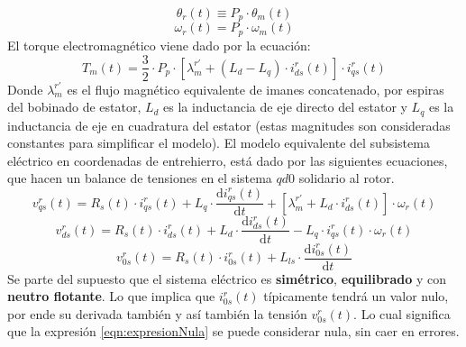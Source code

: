 \documentclass[10pt]{article}
\begin{document}
\begin{enumerate}
\begin{itemize}
\begin{equation}
		\end{equation}
		\begin{equation}
			\theta_{r} \left ( t \right ) \equiv P_{p} \cdot \theta_{m} \left ( t \right )
		\end{equation}
		\begin{equation}
			\omega_{r}\left ( t \right )=P_{p}\cdot \omega_{m}\left ( t \right )
		\end{equation}
		El torque electromagnético viene dado por la ecuación:
		\begin{equation}
			\label{sist:electromagnetico}
			T_{m}\left ( t \right )=\frac{3}{2} \cdot P_{p} \cdot \left [ \lambda_{m}^{r'}+\left ( L_{d}-L_{q} \right )\cdot i_{ds}^{r} \left ( t \right ) \right ] \cdot i_{qs}^{r}\left ( t \right )
		\end{equation}
		Donde $\lambda_{m}^{r'}$ es el flujo magnético equivalente de imanes concatenado, por espiras del bobinado de estator,
		$L_{d}$ es la inductancia de eje directo del estator y $L_{q}$ es la inductancia de eje en cuadratura del estator (estas magnitudes son consideradas constantes para simplificar el modelo).
		El modelo equivalente del subsistema eléctrico en coordenadas de entrehierro, está dado por las siguientes ecuaciones, que hacen un balance de tensiones en el sistema $qd0$ solidario al rotor.
		\begin{equation}
			\label{sist:electrico1}
			v_{qs}^{r}\left ( t \right )=R_{s}\left ( t \right )\cdot i_{qs}^{r}\left ( t \right )+L_{q}\cdot \frac{\mathrm{d} i_{qs}^{r}\left ( t \right )}{\mathrm{d} t}+\left [ \lambda_{m}^{r'}+L_{d}\cdot i_{ds}^{r}\left ( t \right ) \right ]\cdot \omega_{r}\left ( t \right )
		\end{equation}
		\begin{equation}
			\label{sist:electrico2}
			v_{ds}^{r}\left ( t \right )=R_{s}\left ( t \right )\cdot i_{ds}^{r}\left ( t \right )+L_{d}\cdot \frac{\mathrm{d} i_{ds}^{r}\left ( t \right )}{\mathrm{d} t}-L_{q}\cdot i_{qs}^{r}\left ( t \right )\cdot \omega_{r}\left ( t \right )
		\end{equation}
		\begin{equation}
			\label{eqn:expresionNula}
			v_{0s}^{r}\left ( t \right )=R_{s}\left ( t \right )\cdot i_{0s}^{r}\left ( t \right )+L_{ls}\cdot \frac{\mathrm{d} i_{0s}^{r}\left ( t \right )}{\mathrm{d} t}
		\end{equation}
		Se parte del supuesto que el sistema eléctrico es \textbf{simétrico}, \textbf{equilibrado} y con \textbf{neutro flotante}.
		Lo que implica que $i_{0s}^{r}(t)$ típicamente tendrá un valor nulo, por ende su derivada también y así también la tensión $v_{0s}^{r}(t)$.
		Lo cual significa que la expresión \ref{eqn:expresionNula} se puede considerar nula, sin caer en errores.
		

\end{itemize}
\end{enumerate}
\end{document}
